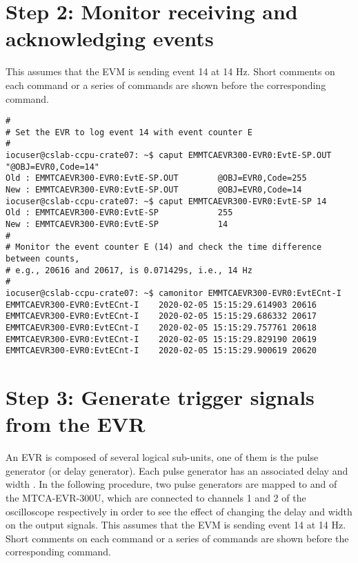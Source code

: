 \documentclass[11pt
  , a4paper
  , article
  , oneside
  , showtrims
]{memoir}
\begin{document}
{\section{Step 2: Monitor receiving and acknowledging events}
This assumes that the EVM is sending event 14 at 14 Hz. Short comments on each command or a series of commands are shown before the corresponding command.
\begin{lstlisting}[style=termstylenumber]
#
# Set the EVR to log event 14 with event counter E
#
iocuser@cslab-ccpu-crate07: ~$ caput EMMTCAEVR300-EVR0:EvtE-SP.OUT "@OBJ=EVR0,Code=14"
Old : EMMTCAEVR300-EVR0:EvtE-SP.OUT        @OBJ=EVR0,Code=255
New : EMMTCAEVR300-EVR0:EvtE-SP.OUT        @OBJ=EVR0,Code=14
iocuser@cslab-ccpu-crate07: ~$ caput EMMTCAEVR300-EVR0:EvtE-SP 14
Old : EMMTCAEVR300-EVR0:EvtE-SP            255
New : EMMTCAEVR300-EVR0:EvtE-SP            14
#
# Monitor the event counter E (14) and check the time difference between counts,
# e.g., 20616 and 20617, is 0.071429s, i.e., 14 Hz
#
iocuser@cslab-ccpu-crate07: ~$ camonitor EMMTCAEVR300-EVR0:EvtECnt-I
EMMTCAEVR300-EVR0:EvtECnt-I    2020-02-05 15:15:29.614903 20616
EMMTCAEVR300-EVR0:EvtECnt-I    2020-02-05 15:15:29.686332 20617
EMMTCAEVR300-EVR0:EvtECnt-I    2020-02-05 15:15:29.757761 20618
EMMTCAEVR300-EVR0:EvtECnt-I    2020-02-05 15:15:29.829190 20619
EMMTCAEVR300-EVR0:EvtECnt-I    2020-02-05 15:15:29.900619 20620
\end{lstlisting}


\section{Step 3: Generate trigger signals from the EVR}
An EVR is composed of several logical sub-units, one of them is the pulse generator (or delay generator). Each pulse generator has an associated delay and width \cite{EVR-USER-GUIDE}. In the following procedure, two pulse generators are mapped to  and  of the MTCA-EVR-300U, which are connected to channels 1 and 2 of the oscilloscope respectively in order to see the effect of changing the delay and width on the output signals. This assumes that the EVM is sending event 14 at 14 Hz. Short comments on each command or a series of commands are shown before the corresponding command.\\

}
\end{document}
